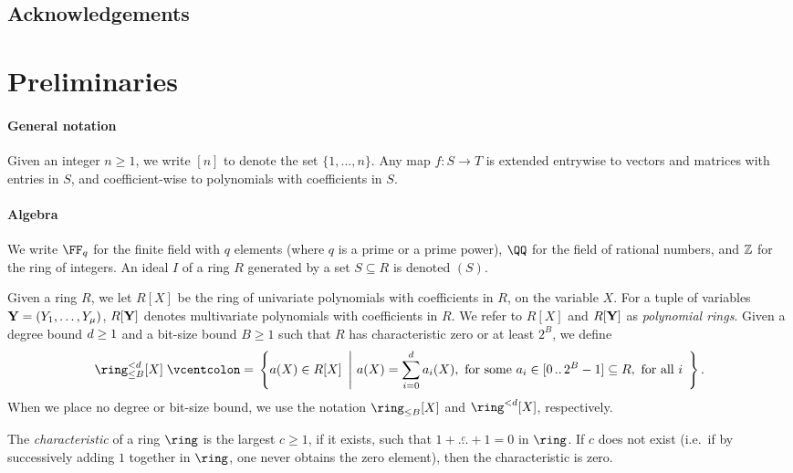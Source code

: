 \documentclass[11pt,letterpaper,usenames,dvipsnames]{article}
\begin{document}
\subsection{Acknowledgements}

\section{Preliminaries}

\paragraph{General notation} Given an integer $n\geq 1$, we write $[n]$ to denote the set $\{1,\ldots, n\}$. Any map $f: S\to T$ is extended entrywise to vectors and matrices with entries in $S$, and coefficient-wise to polynomials with coefficients in $S$.

\paragraph{Algebra}
We write $\FF_q$ for the finite field with $q$ elements (where $q$ is a prime or a prime power), $\QQ$ for the field of rational numbers, and $\mathbb{Z}$ for the ring of integers. An ideal $I$ of a ring $R$ generated by a set $S\subseteq R$ is denoted $(S)$.

Given a ring $R$, we let $R[X]$ be the ring of univariate polynomials with coefficients in $R$, on the variable $X$. For a tuple of variables $\mathbf{Y}=(Y_1,\ldots, Y_\mu)$, $R[\mathbf{Y}]$ denotes multivariate polynomials with coefficients in $R$. We refer to $R[X]$ and $R[\mathbf{Y}]$ as \emph{polynomial rings}. Given a degree bound $d\geq 1$ and a bit-size bound $B\geq 1$ such that $R$ has characteristic zero or at least $2^{B}$, we define 
%
$$
\ringtwobounds{B}{\moduledegree}[X]\defeq \left\{a(X) \in R[X]\ \left| \ a(X) = \sum_{i=0}^{d} a_i(X), \ \text{for some } a_i\in \range{0}{2^{B}-1}\subseteq R, \ \text{for all }i \ \right.\right\}.
$$
When we place no degree or bit-size bound, we use the notation $\ringbitbound{B}[X]$ and $\ringdegbound{\moduledegree}[X]$, respectively. 

  The \emph{characteristic} of a ring $\ring$ is the largest $c\geq 1$, if it exists, such that $1 + \overset{c}{\ldots} + 1 = 0$ in $\ring$. If $c$ does not exist (i.e.\ if by successively adding $1$ together in $\ring$, one never obtains the zero element), then the characteristic is zero.  
\end{document}
